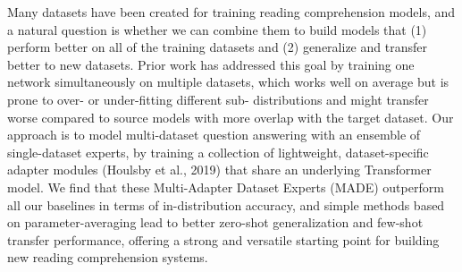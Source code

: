 Many datasets have been created for training reading comprehension models, and a natural question is whether we can combine them to build models that (1) perform better on all of the training datasets and (2) generalize and transfer better to new datasets. Prior work has addressed this goal by training one network simultaneously on multiple datasets, which works well on average but is prone to over- or under-fitting different sub- distributions and might transfer worse compared to source models with more overlap with the target dataset. Our approach is to model multi-dataset question answering with an ensemble of single-dataset experts, by training a collection of lightweight, dataset-specific adapter modules (Houlsby et al., 2019) that share an underlying Transformer model. We find that these Multi-Adapter Dataset Experts (MADE) outperform all our baselines in terms of in-distribution accuracy, and simple methods based on parameter-averaging lead to better zero-shot generalization and few-shot transfer performance, offering a strong and versatile starting point for building new reading comprehension systems.
